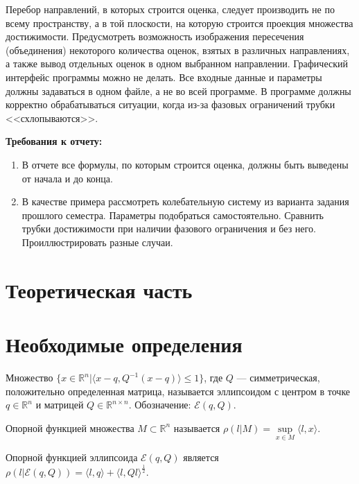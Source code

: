 \documentclass[12pt]{article}
\begin{document}
		Перебор направлений, в которых строится оценка, следует производить не по всему пространству, а в той плоскости, на которую строится проекция множества достижимости. Предусмотреть возможность изображения пересечения (объединения) некоторого количества оценок, взятых в различных направлениях, а также вывод отдельных оценок в одном выбранном направлении.
		Графический интерфейс программы можно не делать. Все входные данные и параметры должны задаваться в одном файле, а не во всей программе.
		В программе должны корректно обрабатываться ситуации, когда из-за фазовых ограничений трубки <<схлопываются>>.
		
        \textbf{Требования к отчету:}

        \begin{enumerate}
          \item В отчете все формулы, по которым строится оценка, должны быть выведены от начала и до конца.
          \item В качестве примера рассмотреть колебательную систему из варианта задания прошлого семестра. Параметры подобраться самостоятельно. Сравнить трубки достижимости при наличии фазового ограничения и без него. Проиллюстрировать разные случаи.
        \end{enumerate}
        
\section{Теоретическая часть}
	\section{Необходимые определения}
	\begin{definition}
		Множество $\{x \in  \mathbb{R}^n | \langle x - q, Q^{-1} (x - q) \rangle \leqslant 1 \}$, где $Q$ --- симметрическая, положительно определенная матрица, называется эллипсоидом с центром в точке $q \in  \mathbb{R}^n$ и матрицей $Q \in \mathbb{R}^{n \times n}$. Обозначение: $\mathcal{E} (q, Q)$.
	\end{definition}
	
	\begin{definition}
		Опорной функцией множества $M \subset \mathbb{R}^n$ называется $\rho (l | M ) = \sup\limits_{x \in M} \langle l, x \rangle$.
	\end{definition}	
	
	Опорной функцией эллипсоида $\mathcal{E} (q, Q)$ является $\rho (l | \mathcal{E} (q, Q)) = \langle l, q \rangle + \langle l, Ql \rangle^{\frac{1}{2}}$.
	
\end{document}

